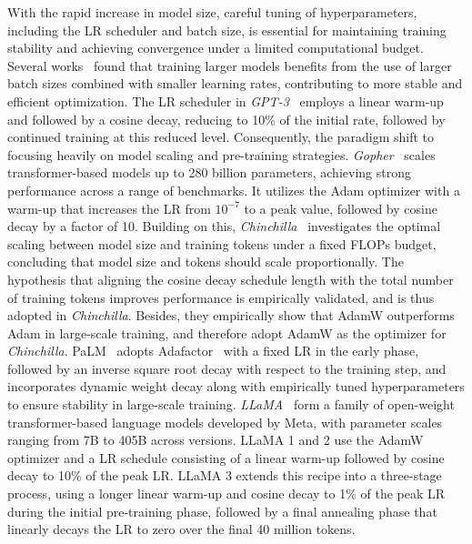 With the rapid increase in model size, careful tuning of hyperparameters, including the LR scheduler and batch size, is essential for maintaining training stability and achieving convergence under a limited computational budget. Several works~\cite{mccandlish2018empirical}\cite{kreps2022all}\cite{brown2020language} found that training larger models benefits from the use of larger batch sizes combined with smaller learning rates, contributing to more stable and efficient optimization. The LR scheduler in \textit{GPT-3}~\cite{brown2020language} employs a linear warm-up and followed by a cosine decay, reducing to 10\% of the initial rate, followed by continued training at this reduced level. Consequently, the paradigm shift to focusing heavily on model scaling and pre-training strategies.
\textit{Gopher}~\cite{rae2021scaling} scales transformer-based models up to 280 billion parameters, achieving strong performance across a range of benchmarks. It utilizes the Adam optimizer with a warm-up that increases the LR from $10^{-7}$ to a peak value, followed by cosine decay by a factor of 10. 
Building on this, \textit{Chinchilla}~\cite{hoffmann2022training} investigates the optimal scaling between model size and training tokens under a fixed FLOPs budget, concluding that model size and tokens should scale proportionally. The hypothesis that aligning the cosine decay schedule length with the total number of training tokens improves performance is empirically validated, and is thus adopted in \textit{Chinchilla}. Besides, they empirically show that AdamW outperforms Adam in large-scale training, and therefore adopt AdamW as the optimizer for \textit{Chinchilla}.
PaLM~\cite{chowdhery2023palm} adopts Adafactor~\cite{shazeer2018adafactor} with a fixed LR in the early phase, followed by an inverse square root decay with respect to the training step, and incorporates dynamic weight decay along with empirically tuned hyperparameters to ensure stability in large-scale training.
\textit{LLaMA}~\cite{touvron2023llama, touvron2023llama2, dubey2024llama} form a family of open-weight transformer-based language models developed by Meta, with parameter scales ranging from 7B to 405B across versions. LLaMA 1 and 2 use the AdamW optimizer and a LR schedule consisting of a linear warm-up followed by cosine decay to 10\% of the peak LR. LLaMA 3 extends this recipe into a three-stage process, using a longer linear warm-up and cosine decay to 1\% of the peak LR during the initial pre-training phase, followed by a final annealing phase that linearly decays the LR to zero over the final 40 million tokens. %
